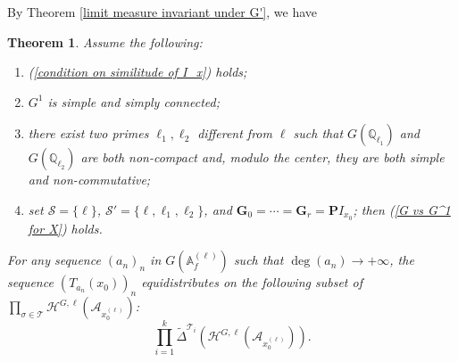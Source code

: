 \documentclass[11pt,oneside,reqno]{amsart}
\newcommand{\A}{\mathbb{A}}
\newcommand{\Q}{\mathbb{Q}}
\newcommand{\Acal}{\mathcal{A}}
\newcommand{\Hcal}{\mathcal{H}}
\newcommand{\Scal}{\mathcal{S}}
\newcommand{\Tcal}{\mathcal{T}}
\newcommand{\Gbf}{\mathbf{G}}
\newcommand{\Pbf}{\mathbf{P}}
\theoremstyle{plain}
\newtheorem{theorem}{Theorem}[section]
\begin{document}
	By Theorem \ref{limit measure invariant under G'}, we have
	\begin{theorem}\label{T_{a_n(x_0)} equidistribute on Shimura variety}
		Assume the following:
		\begin{enumerate}
			\item
			(\ref{condition on similitude of I_x}) holds;
			
			\item
			$G^1$ is simple and simply connected;
			
			\item
			there exist two primes $\ell_1,\ell_2$ different from $\ell$ such that $G(\Q_{\ell_1})$ and $G(\Q_{\ell_2})$ are both non-compact and, modulo the center, they are both simple and non-commutative;
			
			\item
			set $\Scal=\{\ell\}$, $\Scal'=\{\ell,\ell_1,\ell_2\}$, and $\Gbf_0=\cdots=\Gbf_r=\Pbf I_{x_0}$; then (\ref{G vs G^1 for X}) holds.
		\end{enumerate}
		For any sequence $(a_n)_n$ in $G(\A_f^{(\ell)})$ such that $\deg(a_n)\to+\infty$, the sequence $(T_{a_n}(x_0))_n$ equidistributes on the following subset of $\prod_{\sigma\in\Tcal}\Hcal^{G,\ell}(\Acal_{x_0^{(\ell)}})$:
		\[
		\prod_{i=1}^k\widetilde{\Delta}^{\Tcal_i}(\Hcal^{G,\ell}(\Acal_{x_0^{(\ell)}})).
		\]
	\end{theorem}
	
	
	
	
	
	
	
	
	
	
	
	
	
	
	
	
	
	
	
	
	
	
	
	
	
	
	
	
	
	
	
	
	
	
	
	
	
	
	
\end{document}
